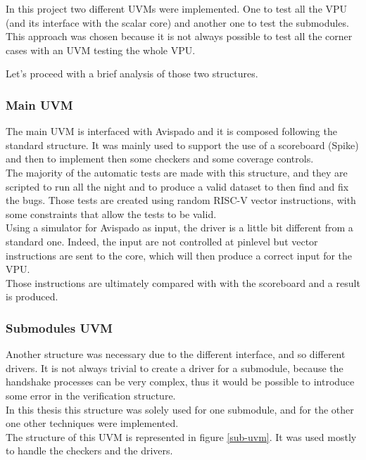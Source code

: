 In this project two different UVMs were implemented. One to test all the VPU (and its interface with the scalar core) and another one to test the submodules. This approach was chosen because it is not always possible to test all the corner cases with an UVM testing the whole VPU.

Let's proceed with a brief analysis of those two structures.

\subsubsection{Main UVM}
The main UVM is interfaced with Avispado and it is composed following the standard structure. It was mainly used to support the use of a scoreboard (Spike) and then to implement then some checkers and some coverage controls.\\

The majority of the automatic tests are made with this structure, and they are scripted to run all the night and to produce a valid dataset to then find and fix the bugs. Those tests are created using random RISC-V vector instructions, with some constraints that allow the tests to be valid.\\

Using a simulator for Avispado as input, the driver is a little bit different from a standard one. Indeed, the input are not controlled at pinlevel but vector instructions are sent to the core, which will then produce a correct input for the VPU.\\

Those instructions are ultimately compared with with the scoreboard and a result is produced.

\subsubsection{Submodules UVM}

Another structure was necessary due to the different interface, and so different drivers. It is not always trivial to create a driver for a submodule, because the handshake processes can be very complex, thus it would be possible to introduce some error in the verification structure.\\

In this thesis this structure was solely used for one submodule, and for the other one other techniques were implemented.\\

The structure of this UVM is represented in figure \ref{sub-uvm}. It was used mostly to handle the checkers and the drivers.

